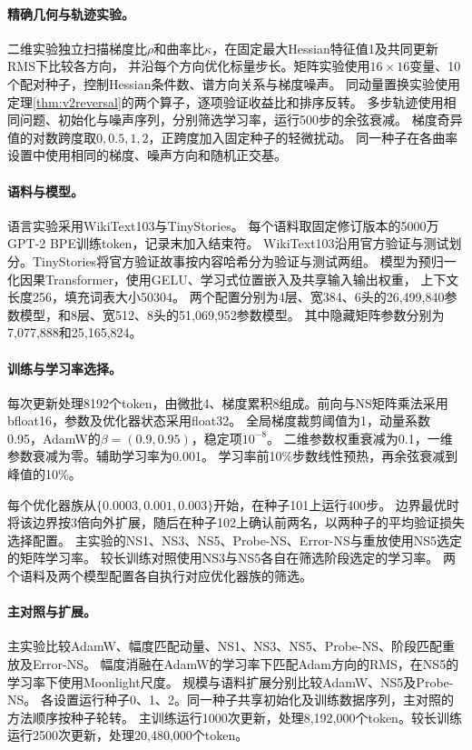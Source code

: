\paragraph{精确几何与轨迹实验。}
二维实验独立扫描梯度比$\rho$和曲率比$\kappa$，在固定最大Hessian特征值1及共同更新RMS下比较各方向，
并沿每个方向优化标量步长。矩阵实验使用$16\times16$变量、10个配对种子，控制Hessian条件数、谱方向关系与梯度噪声。
同动量置换实验使用定理\ref{thm:v2reversal}的两个算子，逐项验证收益比和排序反转。
多步轨迹使用相同问题、初始化与噪声序列，分别筛选学习率，运行500步的余弦衰减。
梯度奇异值的对数跨度取$0,0.5,1,2$，正跨度加入固定种子的轻微扰动。
同一种子在各曲率设置中使用相同的梯度、噪声方向和随机正交基。

\paragraph{语料与模型。}
语言实验采用WikiText103\cite{merity2016wikitext}与TinyStories\cite{eldan2023tinystories}。
每个语料取固定修订版本的5000万GPT-2 BPE训练token，记录末加入结束符。
WikiText103沿用官方验证与测试划分。TinyStories将官方验证故事按内容哈希分为验证与测试两组。
模型为预归一化因果Transformer，使用GELU、学习式位置嵌入及共享输入输出权重，
上下文长度256，填充词表大小50304。
两个配置分别为4层、宽384、6头的26,499,840参数模型，和8层、宽512、8头的51,069,952参数模型。
其中隐藏矩阵参数分别为7,077,888和25,165,824。

\paragraph{训练与学习率选择。}
每次更新处理8192个token，由微批4、梯度累积8组成。前向与NS矩阵乘法采用bfloat16，参数及优化器状态采用float32。
全局梯度裁剪阈值为1，动量系数0.95，AdamW的$\beta=(0.9,0.95)$，稳定项$10^{-8}$。
二维参数权重衰减为0.1，一维参数衰减为零。辅助学习率为0.001。
学习率前10\%步数线性预热，再余弦衰减到峰值的10\%。

每个优化器族从$\{0.0003,0.001,0.003\}$开始，在种子101上运行400步。
边界最优时将该边界按3倍向外扩展，随后在种子102上确认前两名，以两种子的平均验证损失选择配置。
主实验的NS1、NS3、NS5、Probe-NS、Error-NS与重放使用NS5选定的矩阵学习率。
较长训练对照使用NS3与NS5各自在筛选阶段选定的学习率。
两个语料及两个模型配置各自执行对应优化器族的筛选。

\paragraph{主对照与扩展。}
主实验比较AdamW、幅度匹配动量、NS1、NS3、NS5、Probe-NS、阶段匹配重放及Error-NS。
幅度消融在AdamW的学习率下匹配Adam方向的RMS，在NS5的学习率下使用Moonlight尺度。
规模与语料扩展分别比较AdamW、NS5及Probe-NS。
各设置运行种子0、1、2。同一种子共享初始化及训练数据序列，主对照的方法顺序按种子轮转。
主训练运行1000次更新，处理8,192,000个token。较长训练运行2500次更新，处理20,480,000个token。


